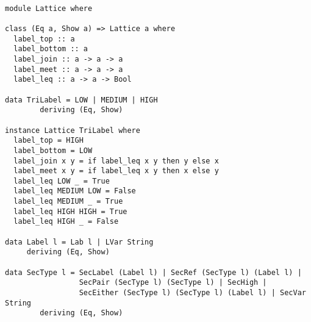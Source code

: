 \begin{Verbatim}[fontsize=\footnotesize,frame=lines,
                 framesep=5mm, label={[Lattice.hs]Lattice.hs}]

module Lattice where

class (Eq a, Show a) => Lattice a where
  label_top :: a
  label_bottom :: a
  label_join :: a -> a -> a
  label_meet :: a -> a -> a
  label_leq :: a -> a -> Bool

data TriLabel = LOW | MEDIUM | HIGH 
		deriving (Eq, Show)

instance Lattice TriLabel where
  label_top = HIGH
  label_bottom = LOW
  label_join x y = if label_leq x y then y else x
  label_meet x y = if label_leq x y then x else y
  label_leq LOW _ = True
  label_leq MEDIUM LOW = False
  label_leq MEDIUM _ = True
  label_leq HIGH HIGH = True
  label_leq HIGH _ = False

data Label l = Lab l | LVar String
     deriving (Eq, Show)

data SecType l = SecLabel (Label l) | SecRef (SecType l) (Label l) | 
                 SecPair (SecType l) (SecType l) | SecHigh | 
                 SecEither (SecType l) (SecType l) (Label l) | SecVar String 
		deriving (Eq, Show)


\end{Verbatim}
